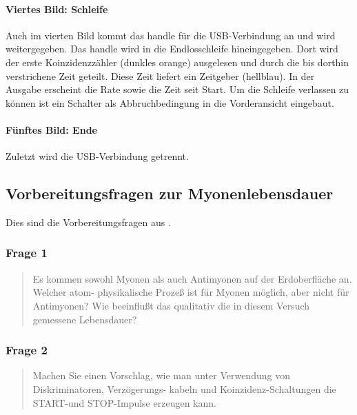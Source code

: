 \documentclass[11pt, ngerman, fleqn, DIV=15, headinclude, BCOR=2cm]{scrreprt}
\begin{document}
\paragraph{Viertes Bild: Schleife}

Auch im vierten Bild kommt das handle für die USB-Verbindung an und wird
weitergegeben. Das handle wird in die Endlosschleife hineingegeben. Dort wird
der erste Koinzidenzzähler (dunkles orange) ausgelesen und durch die bis
dorthin verstrichene Zeit geteilt. Diese Zeit liefert ein Zeitgeber (hellblau).
In der Ausgabe erscheint die Rate sowie die Zeit seit Start. Um die Schleife
verlassen zu können ist ein Schalter als Abbruchbedingung in die Vorderansicht
eingebaut.

\paragraph{Fünftes Bild: Ende}

Zuletzt wird die USB-Verbindung getrennt.

\subsection{Vorbereitungsfragen zur Myonenlebensdauer}

Dies sind die Vorbereitungsfragen aus \parencite[14]{physik512-Anleitung}.

\subsubsection{Frage 1}

\begin{quote}
    Es kommen sowohl Myonen als auch Antimyonen auf der Erdoberfläche an.
    Welcher atom- physikalische Prozeß ist für Myonen möglich, aber nicht für
    Antimyonen? Wie beeinflußt das qualitativ die in diesem Versuch gemessene
    Lebensdauer?
\end{quote}


\subsubsection{Frage 2}

\begin{quote}
    Machen Sie einen Vorschlag, wie man unter Verwendung von Diskriminatoren,
    Verzögerungs- kabeln und Koinzidenz-Schaltungen die START-und STOP-Impulse
    erzeugen kann.
\end{quote}
\end{document}
